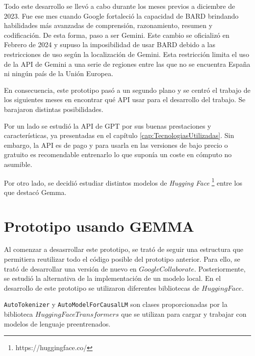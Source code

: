 Todo este desarrollo se llevó a cabo durante los meses previos a diciembre de 2023. Fue ese mes cuando Google fortaleció la capacidad de BARD brindando habilidades más avanzadas de comprensión, razonamiento, resumen y codificación. De esta forma, paso a ser Gemini. Este cambio se oficializó en Febrero de 2024 y supuso la imposibilidad de usar BARD debido a las restricciones de uso según la localización de Gemini. Esta restricción limita el uso de la API de Gemini a una serie de regiones entre las que no se encuentra España ni ningún país de la Unión Europea.

En consecuencia, este prototipo pasó a un segundo plano y se centró el trabajo de los siguientes meses en encontrar qué API usar para el desarrollo del trabajo. Se barajaron distintas posibilidades. 

Por un lado se estudió la API de GPT por sus buenas prestaciones y características, ya presentadas en el capítulo \ref{cap:TecnologiasUtilizadas}. Sin embargo, la API es de pago y para usarla en las versiones de bajo precio o gratuito es recomendable entrenarlo lo que suponía un coste en cómputo no asumible. 

Por otro lado, se decidió estudiar distintos modelos de \textit{Hugging Face} \footnote{https://huggingface.co/} entre los que destacó Gemma. 

\section{Prototipo usando GEMMA}
Al comenzar a desasrrollar este prototipo, se trató de seguir una estructura que permitiera reutilizar todo el código posible del prototipo anterior. Para ello, se trató de desarrollar una versión de nuevo en $Google Collaborate$. Posteriormente, se estudió la alternativa de la implementación de un modelo local. En el desarrollo de este prototipo se utilizaron diferentes bibliotecas de $Hugging Face$.

\texttt{AutoTokenizer} y \texttt{AutoModelForCausalLM} son clases proporcionadas por la biblioteca $Hugging Face Transformers$ que se utilizan para cargar y trabajar con modelos de lenguaje preentrenados.

